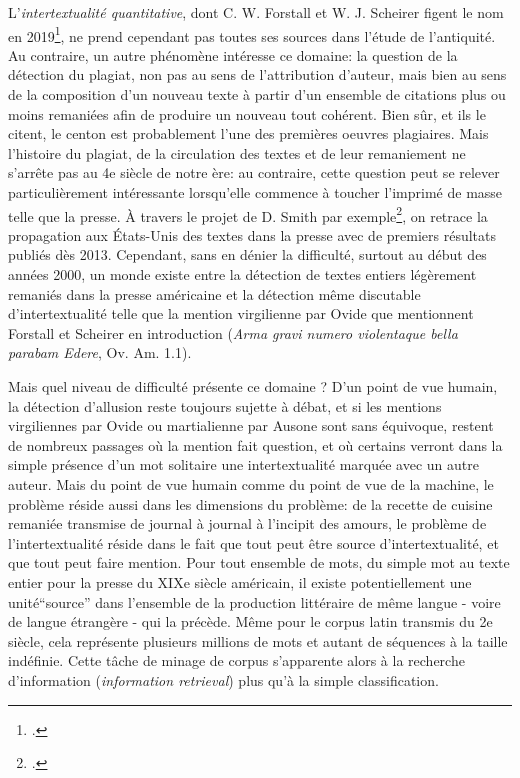 L'\textit{intertextualité quantitative}, dont C. W. Forstall et W. J. Scheirer figent le nom en 2019\footcite{forstall_quantitative_2019}, ne prend cependant pas toutes ses sources dans l'étude de l'antiquité. Au contraire, un autre phénomène intéresse ce domaine: la question de la détection du plagiat, non pas au sens de l'attribution d'auteur, mais bien au sens de la composition d'un nouveau texte à partir d'un ensemble de citations plus ou moins remaniées afin de produire un nouveau tout cohérent. Bien sûr, et ils le citent, le centon est probablement l'une des premières oeuvres plagiaires. Mais l'histoire du plagiat, de la circulation des textes et de leur remaniement ne s'arrête pas au 4e siècle de notre ère: au contraire, cette question peut se relever particulièrement intéressante lorsqu'elle commence à toucher l'imprimé de masse telle que la presse. À travers le projet de D. Smith par exemple\footcite{smith_computational_2015, smith_infectious_2013}, on retrace la propagation aux États-Unis des textes dans la presse avec de premiers résultats publiés dès 2013. Cependant, sans en dénier la difficulté, surtout au début des années 2000, un monde existe entre la détection de textes entiers légèrement remaniés dans la presse américaine et la détection même discutable d'intertextualité telle que la mention virgilienne par Ovide que mentionnent Forstall et Scheirer en introduction (\textit{Arma gravi numero violentaque bella parabam Edere}, Ov. Am. 1.1). 

Mais quel niveau de difficulté présente ce domaine ? D'un point de vue humain, la détection d'allusion reste toujours sujette à débat, et si les mentions virgiliennes par Ovide ou martialienne par Ausone sont sans équivoque, restent de nombreux passages où la mention fait question, et où certains verront dans la simple présence d'un mot solitaire une intertextualité marquée avec un autre auteur. Mais du point de vue humain comme du point de vue de la machine, le problème réside aussi dans les dimensions du problème: de la recette de cuisine remaniée transmise de journal à journal à l'incipit des amours, le problème de l'intertextualité réside dans le fait que tout peut être source d'intertextualité, et que tout peut faire mention. Pour tout ensemble de mots, du simple mot au texte entier pour la presse du XIXe siècle américain, il existe potentiellement une unité\enquote{source} dans l'ensemble de la production littéraire de même langue - voire de langue étrangère - qui la précède. Même pour le corpus latin transmis du 2e siècle, cela représente plusieurs millions de mots et autant de séquences à la taille indéfinie. Cette tâche de minage de corpus s'apparente alors à la recherche d'information (\textit{information retrieval}) plus qu'à la simple classification.

